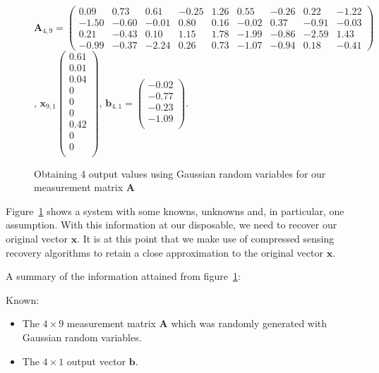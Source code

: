 \documentclass[titlepage,oneside, 12pt]{book}
\theoremstyle{break}
\begin{document}
\begin{figure}[H]
\centering
$
\textbf{A}_{4,9} = \begin{pmatrix}
0.09  	&0.73	&0.61	&-0.25	&1.26	&0.55	&-0.26	&0.22	&-1.22\\
-1.50	&-0.60	&-0.01 	&0.80	&0.16 	&-0.02	&0.37 	&-0.91	&-0.03\\
0.21	&-0.43	&0.10	&1.15	&1.78	&-1.99	&-0.86	&-2.59	&1.43\\
-0.99	&-0.37	&-2.24	&0.26	&0.73	&-1.07	&-0.94 	&0.18	&-0.41
\end{pmatrix}  
$,
$
\textbf{x}_{9,1}\begin{pmatrix}
0.61\\
0.01\\
0.04\\
0\\
0\\
0\\
0.42\\
0\\
0\\
\end{pmatrix}  
$,
$
\textbf{b}_{4, 1} = \begin{pmatrix}
-0.02\\
-0.77\\
-0.23\\
-1.09\\
\end{pmatrix}  
$.

\caption{Obtaining 4 output values using Gaussian random variables for our measurement matrix $\textbf{A}$}
\label{fig:CSex3}
\end{figure}

Figure~\ref{fig:CSex3} shows a system with some knowns, unknowns and, in particular, one assumption. With this information at our disposable, we need to recover our original vector $\textbf{x}$. It is at this point that we make use of compressed sensing recovery algorithms to retain a close approximation to the original vector $\textbf{x}$. 

\newpage

\begin{flushleft}
A summary of the information attained from figure~\ref{fig:CSex3}:
\end{flushleft}

Known:

\begin{itemize}
\item The $4 \times 9$ measurement matrix $\textbf{A}$ which was randomly generated with Gaussian random variables.
\item The $ 4 \times 1$ output vector $\textbf{b}$.
\end{itemize}
\end{document}
